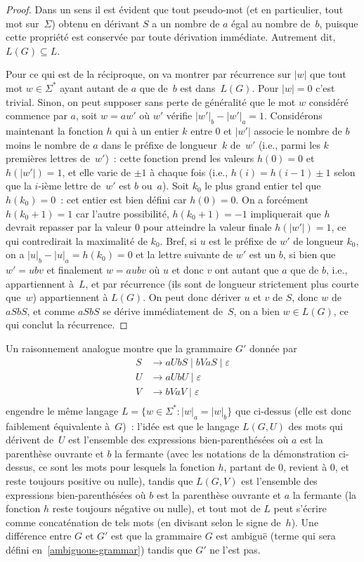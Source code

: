 \documentclass[12pt,a4paper]{article}
\theoremstyle{definition}
\begin{document}
\begin{proof}
Dans un sens il est évident que tout pseudo-mot (et en particulier,
tout mot sur $\Sigma$) obtenu en dérivant $S$ a un nombre de $a$ égal
au nombre de $b$, puisque cette propriété est conservée par toute
dérivation immédiate.  Autrement dit, $L(G) \subseteq L$.

Pour ce qui est de la réciproque, on va montrer par récurrence sur
$|w|$ que tout mot $w \in \Sigma^*$ ayant autant de $a$ que de $b$ est
dans $L(G)$.  Pour $|w|=0$ c'est trivial.  Sinon, on peut supposer
sans perte de généralité que le mot $w$ considéré commence par $a$,
soit $w = aw'$ où $w'$ vérifie $|w'|_b - |w'|_a = 1$.  Considérons
maintenant la fonction $h$ qui à un entier $k$ entre $0$ et $|w'|$
associe le nombre de $b$ moins le nombre de $a$ dans le préfixe de
longueur $k$ de $w'$ (i.e., parmi les $k$ premières lettres de $w'$) :
cette fonction prend les valeurs $h(0) = 0$ et $h(|w'|) = 1$, et elle
varie de $\pm 1$ à chaque fois (i.e., $h(i) = h(i-1) \pm 1$ selon que
la $i$-ième lettre de $w'$ est $b$ ou $a$).  Soit $k_0$ le plus grand
entier tel que $h(k_0) = 0$ : cet entier est bien défini car $h(0)=0$.
On a forcément $h(k_0+1) = 1$ car l'autre possibilité, $h(k_0+1) = -1$
impliquerait que $h$ devrait repasser par la valeur $0$ pour atteindre
la valeur finale $h(|w'|) = 1$, ce qui contredirait la maximalité de
$k_0$.  Bref, si $u$ est le préfixe de $w'$ de longueur $k_0$, on a
$|u|_b - |u|_a = h(k_0) = 0$ et la lettre suivante de $w'$ est un $b$,
si bien que $w' = ubv$ et finalement $w = aubv$ où $u$ et donc $v$ ont
autant que $a$ que de $b$, i.e., appartiennent à $L$, et par
récurrence (ils sont de longueur strictement plus courte que $w$)
appartiennent à $L(G)$.  On peut donc dériver $u$ et $v$ de $S$, donc
$w$ de $aSbS$, et comme $aSbS$ se dérive immédiatement de $S$, on a
bien $w \in L(G)$, ce qui conclut la récurrence.
\end{proof}

Un raisonnement analogue montre que la grammaire $G'$ donnée par
\[
\begin{aligned}
S &\rightarrow aUbS \;|\; bVaS \;|\; \varepsilon\\
U &\rightarrow aUbU \;|\; \varepsilon\\
V &\rightarrow bVaV \;|\; \varepsilon\\
\end{aligned}
\]
engendre le même langage $L = \{w \in\Sigma^* : |w|_a = |w|_b\}$ que
ci-dessus (elle est donc faiblement équivalente à $G$) : l'idée est
que le langage $L(G,U)$ des mots qui dérivent de $U$ est l'ensemble
des expressions bien-parenthésées où $a$ est la parenthèse ouvrante et
$b$ la fermante (avec les notations de la démonstration ci-dessus, ce
sont les mots pour lesquels la fonction $h$, partant de $0$, revient à
$0$, et reste toujours positive ou nulle), tandis que $L(G,V)$ est
l'ensemble des expressions bien-parenthésées où $b$ est la parenthèse
ouvrante et $a$ la fermante (la fonction $h$ reste toujours négative
ou nulle), et tout mot de $L$ peut s'écrire comme concaténation de
tels mots (en divisant selon le signe de $h$).  Une différence entre
$G$ et $G'$ est que la grammaire $G$ est ambiguë (terme qui sera
défini en \ref{ambiguous-grammar}) tandis que $G'$ ne l'est pas.
\end{document}
